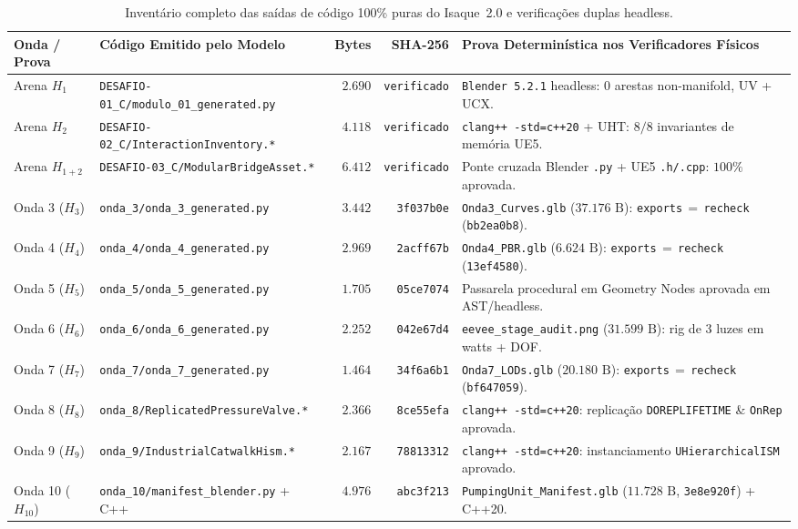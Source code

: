 \documentclass[10pt,a4paper]{article}
\begin{document}
\begin{table}[!htbp]
\centering
\caption{Invent\'ario completo das sa\'idas de c\'odigo 100\% puras do Isaque~2.0 e verifica\c{c}\~oes duplas headless.}
\label{tab:solo_pt}
\footnotesize
\begin{tabularx}{\linewidth}{@{}llrrY@{}}
\toprule
\textbf{Onda / Prova} & \textbf{C\'odigo Emitido pelo Modelo} & \textbf{Bytes} & \textbf{SHA-256} & \textbf{Prova Determin\'istica nos Verificadores F\'isicos} \\
\midrule
Arena $H_1$ & \texttt{DESAFIO-01\_\allowbreak{}C/modulo\_\allowbreak{}01\_\allowbreak{}generated.py} & $2.690$ & \texttt{verificado} & \texttt{Blender 5.2.1} headless: $0$ arestas non-manifold, UV + UCX. \\
Arena $H_2$ & \texttt{DESAFIO-02\_\allowbreak{}C/InteractionInventory.*} & $4.118$ & \texttt{verificado} & \texttt{clang++ -std=c++20} + UHT: $8/8$ invariantes de mem\'oria UE5. \\
Arena $H_{1+2}$ & \texttt{DESAFIO-03\_\allowbreak{}C/ModularBridgeAsset.*} & $6.412$ & \texttt{verificado} & Ponte cruzada Blender \texttt{.py} + UE5 \texttt{.h/.cpp}: $100\%$ aprovada. \\
Onda 3 ($H_3$) & \texttt{onda\_3/onda\_\allowbreak{}3\_\allowbreak{}generated.py} & $3.442$ & \texttt{3f037b0e} & \texttt{Onda3\_Curves.glb} ($37.176\text{ B}$): \texttt{exports}$\,=\,$\texttt{recheck} (\texttt{bb2ea0b8}). \\
Onda 4 ($H_4$) & \texttt{onda\_4/onda\_\allowbreak{}4\_\allowbreak{}generated.py} & $2.969$ & \texttt{2acff67b} & \texttt{Onda4\_PBR.glb} ($6.624\text{ B}$): \texttt{exports}$\,=\,$\texttt{recheck} (\texttt{13ef4580}). \\
Onda 5 ($H_5$) & \texttt{onda\_5/onda\_\allowbreak{}5\_\allowbreak{}generated.py} & $1.705$ & \texttt{05ce7074} & Passarela procedural em Geometry Nodes aprovada em AST/headless. \\
Onda 6 ($H_6$) & \texttt{onda\_6/onda\_\allowbreak{}6\_\allowbreak{}generated.py} & $2.252$ & \texttt{042e67d4} & \texttt{eevee\_stage\_audit.png} ($31.599\text{ B}$): rig de 3 luzes em watts + DOF. \\
Onda 7 ($H_7$) & \texttt{onda\_7/onda\_\allowbreak{}7\_\allowbreak{}generated.py} & $1.464$ & \texttt{34f6a6b1} & \texttt{Onda7\_LODs.glb} ($20.180\text{ B}$): \texttt{exports}$\,=\,$\texttt{recheck} (\texttt{bf647059}). \\
Onda 8 ($H_8$) & \texttt{onda\_8/ReplicatedPressureValve.*} & $2.366$ & \texttt{8ce55efa} & \texttt{clang++ -std=c++20}: replica\c{c}\~ao \texttt{DOREPLIFETIME} \& \texttt{OnRep} aprovada. \\
Onda 9 ($H_9$) & \texttt{onda\_9/IndustrialCatwalkHism.*} & $2.167$ & \texttt{78813312} & \texttt{clang++ -std=c++20}: instanciamento \texttt{UHierarchicalISM} aprovado. \\
Onda 10 ($H_{10}$) & \texttt{onda\_10/manifest\_\allowbreak{}blender.py} + C++ & $4.976$ & \texttt{abc3f213} & \texttt{PumpingUnit\_Manifest.glb} ($11.728\text{ B}$, \texttt{3e8e920f}) + C++20. \\
\bottomrule
\end{tabularx}
\end{table}
\end{document}
